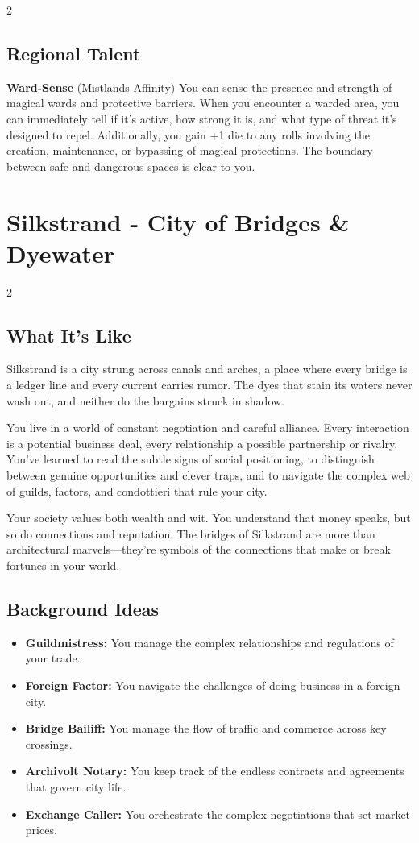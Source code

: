 \documentclass[11pt]{article}
\newcommand{\region}[1]{\section*{#1}}
\newcommand{\subregion}[1]{\subsection*{#1}}
\begin{document}
\begin{multicols}{2}
\subregion{Regional Talent}

\textbf{Ward-Sense} (Mistlands Affinity)
You can sense the presence and strength of magical wards and protective barriers. When you encounter a warded area, you can immediately tell if it's active, how strong it is, and what type of threat it's designed to repel. Additionally, you gain +1 die to any rolls involving the creation, maintenance, or bypassing of magical protections. The boundary between safe and dangerous spaces is clear to you.

\end{multicols}

\region{Silkstrand - City of Bridges \& Dyewater}

\begin{multicols}{2}
\subregion{What It's Like}

Silkstrand is a city strung across canals and arches, a place where every bridge is a ledger line and every current carries rumor. The dyes that stain its waters never wash out, and neither do the bargains struck in shadow.

You live in a world of constant negotiation and careful alliance. Every interaction is a potential business deal, every relationship a possible partnership or rivalry. You've learned to read the subtle signs of social positioning, to distinguish between genuine opportunities and clever traps, and to navigate the complex web of guilds, factors, and condottieri that rule your city.

Your society values both wealth and wit. You understand that money speaks, but so do connections and reputation. The bridges of Silkstrand are more than architectural marvels---they're symbols of the connections that make or break fortunes in your world.

\columnbreak

\subregion{Background Ideas}

\begin{itemize}[leftmargin=*]
    \item \textbf{Guildmistress:} You manage the complex relationships and regulations of your trade.
    \item \textbf{Foreign Factor:} You navigate the challenges of doing business in a foreign city.
    \item \textbf{Bridge Bailiff:} You manage the flow of traffic and commerce across key crossings.
    \item \textbf{Archivolt Notary:} You keep track of the endless contracts and agreements that govern city life.
    \item \textbf{Exchange Caller:} You orchestrate the complex negotiations that set market prices.
\end{itemize}


\end{multicols}
\end{document}
